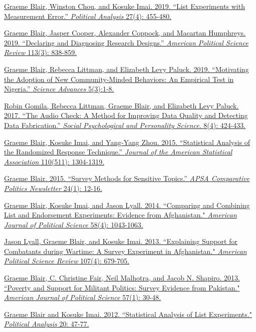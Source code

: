\documentclass[10.9pt]{article}
\begin{document}
\begin{etaremune}
\item \href{https://graemeblair.com/papers/listerror.pdf}{Graeme Blair, Winston Chou, and Kosuke Imai. 2019. ``List Experiments with Measurement Error.'' {\it Political Analysis} 27(4): 455-480.}
\item \href{https://declaredesign.org/declare.pdf}{Graeme Blair, Jasper Cooper, Alexander Coppock, and Macartan Humphreys. 2019. ``Declaring and Diagnosing Research Designs.'' {\it American Political Science Review} 113(3): 838-859.}
\item \href{https://graemeblair.com/papers/nollywood.pdf}{Graeme Blair, Rebecca Littman, and Elizabeth Levy Paluck. 2019. ``Motivating the Adoption of New Community-Minded Behaviors: An Empirical Test in Nigeria.'' {\it Science Advances} 5(3):1-8.}
\item \href{http://graemeblair.com/papers/audiocheck.pdf}{Robin Gomila, Rebecca Littman, Graeme Blair, and Elizabeth Levy Paluck. 2017. ``The Audio Check: A Method for Improving Data Quality and Detecting Data Fabrication.'' {\it Social Psychological and Personality Science}. 8(4): 424-433.}
\item \href{http://graemeblair.com/papers/randresp.pdf}{Graeme Blair, Kosuke Imai, and Yang-Yang Zhou. 2015. ``Statistical Analysis of the Randomized Response Technique.'' {\it Journal of the American Statistical Association} 110(511): 1304-1319.}
\item \href{http://graemeblair.com/papers/sensitive.pdf}{Graeme Blair. 2015. ``Survey Methods for Sensitive Topics.'' {\it APSA Comparative Politics Newsletter} 24(1): 12-16.}
\item \href{http://graemeblair.com/papers/listendorse.pdf}{Graeme Blair, Kosuke Imai, and Jason Lyall. 2014. ``Comparing and Combining List and Endorsement Experiments: Evidence from Afghanistan." {\it American Journal of Political Science} 58(4): 1043-1063.}
\item \href{https://graemeblair.com/papers/afghan.pdf}{Jason Lyall, Graeme Blair, and Kosuke Imai. 2013. ``Explaining Support for Combatants during Wartime: A Survey Experiment in Afghanistan." {\it American Political Science Review} 107(4): 679-705.}
\item \href{http://graemeblair.com/papers/pakistan.pdf}{Graeme Blair, C. Christine Fair, Neil Malhotra, and Jacob N. Shapiro. 2013. ``Poverty and Support for Militant Politics: Survey Evidence from Pakistan." {\it American Journal of Political Science} 57(1): 30-48.} 
\item \href{https://graemeblair.com/papers/list.pdf}{Graeme Blair and Kosuke Imai. 2012. ``Statistical Analysis of List Experiments." {\it Political Analysis} 20: 47-77.}
\end{etaremune}
\vspace{1em}  %
\end{document}
